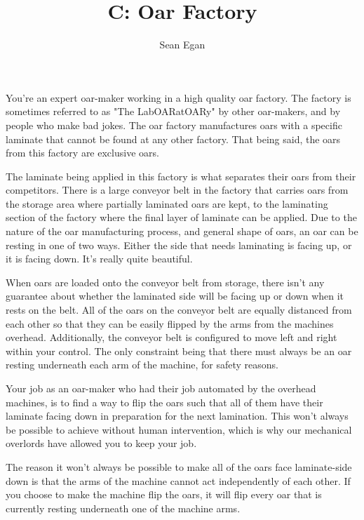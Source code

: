 \documentclass{article}
\title{C: Oar Factory}
\author{Sean Egan}
\begin{document}
\begin{problemDescription}
You're an expert oar-maker working in a high quality oar factory. The factory is sometimes referred to as "The LabOARatOARy" by other oar-makers, and by people who make bad jokes. The oar factory manufactures oars with a specific laminate that cannot be found at any other factory. That being said, the oars from this factory are exclusive oars.

The laminate being applied in this factory is what separates their oars from their competitors. There is a large conveyor belt in the factory that carries oars from the storage area where partially laminated oars are kept, to the laminating section of the factory where the final layer of laminate can be applied. Due to the nature of the oar manufacturing process, and general shape of oars, an oar can be resting in one of two ways. Either the side that needs laminating is facing up, or it is facing down. It's really quite beautiful.

When oars are loaded onto the conveyor belt from storage, there isn't any guarantee about whether the laminated side will be facing up or down when it rests on the belt. All of the oars on the conveyor belt are equally distanced from each other so that they can be easily flipped by the arms from the machines overhead. Additionally, the conveyor belt is configured to move left and right within your control. The only constraint being that there must always be an oar resting underneath each arm of the machine, for safety reasons.

Your job as an oar-maker who had their job automated by the overhead machines, is to find a way to flip the oars such that all of them have their laminate facing down in preparation for the next lamination. This won't always be possible to achieve without human intervention, which is why our mechanical overlords have allowed you to keep your job.

The reason it won't always be possible to make all of the oars face laminate-side down is that the arms of the machine cannot act independently of each other. If you choose to make the machine flip the oars, it will flip every oar that is currently resting underneath one of the machine arms.

\end{problemDescription}
\end{document}
